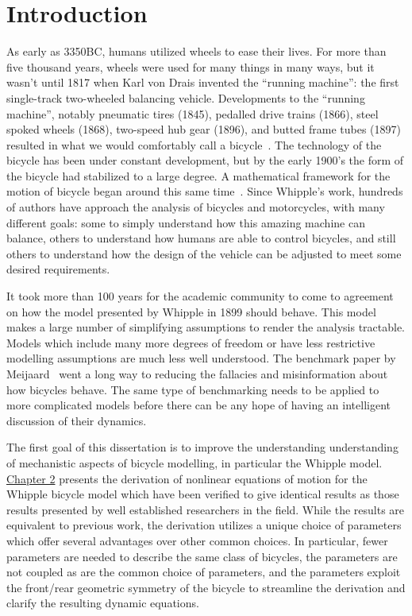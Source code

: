 \chapter{Introduction} \label{chapter1}
As early as 3350BC, humans utilized wheels to ease their lives. For more than
five thousand years, wheels were used for many things in many ways, but it
wasn't until 1817 when Karl von Drais invented the ``running machine'': the
first single-track two-wheeled balancing vehicle. Developments to the ``running
machine'', notably pneumatic tires (1845), pedalled drive trains (1866), steel
spoked wheels (1868), two-speed hub gear (1896), and butted frame tubes (1897)
resulted in what we would comfortably call a bicycle~\cite{Wilson2004}. The
technology of the bicycle has been under constant development, but by the early
1900's the form of the bicycle had stabilized to a large degree. A mathematical
framework for the motion of bicycle began around this same
time~\cite{Whipple1899}. Since Whipple's work, hundreds of authors have approach
the analysis of bicycles and motorcycles, with many different goals: some to
simply understand how this amazing machine can balance, others to understand
how humans are able to control bicycles, and still others to understand how the
design of the vehicle can be adjusted to meet some desired requirements.

It took more than 100 years for the academic community to come to agreement on
how the model presented by Whipple in 1899 should behave. This model makes a
large number of simplifying assumptions to render the analysis tractable.
Models which include many more degrees of freedom or have less restrictive
modelling assumptions are much less well understood. The benchmark paper by
Meijaard~\cite{Meijaard2007} went a long way to reducing the fallacies and
misinformation about how bicycles behave. The same type of benchmarking needs
to be applied to more complicated models before there can be any hope of having
an intelligent discussion of their dynamics.

The first goal of this dissertation is to improve the understanding
understanding of mechanistic aspects of bicycle modelling, in particular the
Whipple model. \hyperref[chapter2]{Chapter 2} presents the derivation of
nonlinear equations of motion for the Whipple bicycle model which have been
verified to give identical results as those results presented by well
established researchers in the field. While the results are equivalent to
previous work, the derivation utilizes a unique choice of parameters which
offer several advantages over other common choices.  In particular, fewer
parameters are needed to describe the same class of bicycles, the parameters
are not coupled as are the common choice of parameters, and the parameters
exploit the front/rear geometric symmetry of the bicycle to streamline the
derivation and clarify the resulting dynamic equations.

